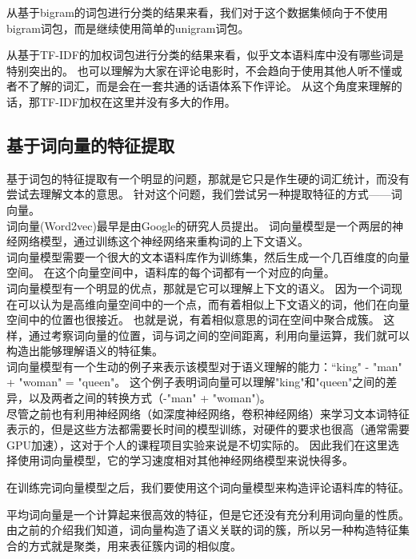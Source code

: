 

从基于bigram的词包进行分类的结果来看，我们对于这个数据集倾向于不使用bigram词包，而是继续使用简单的unigram词包。



从基于TF-IDF的加权词包进行分类的结果来看，似乎文本语料库中没有哪些词是特别突出的。
也可以理解为大家在评论电影时，不会趋向于使用其他人听不懂或者不了解的词汇，而是会在一套共通的话语体系下作评论。
从这个角度来理解的话，那TF-IDF加权在这里并没有多大的作用。

\subsection{基于词向量的特征提取}
基于词包的特征提取有一个明显的问题，那就是它只是作生硬的词汇统计，而没有尝试去理解文本的意思。
针对这个问题，我们尝试另一种提取特征的方式——词向量。\\
词向量(Word2vec)最早是由Google的研究人员提出。
词向量模型是一个两层的神经网络模型，通过训练这个神经网络来重构词的上下文语义。\\
词向量模型需要一个很大的文本语料库作为训练集，然后生成一个几百维度的向量空间。
在这个向量空间中，语料库的每个词都有一个对应的向量。\\
 词向量模型有一个明显的优点，那就是它可以理解上下文的语义。
 因为一个词现在可以认为是高维向量空间中的一个点，而有着相似上下文语义的词，他们在向量空间中的位置也很接近。
 也就是说，有着相似意思的词在空间中聚合成簇。
 这样，通过考察词向量的位置，词与词之间的空间距离，利用向量运算，我们就可以构造出能够理解语义的特征集。\\
 词向量模型有一个生动的例子来表示该模型对于语义理解的能力：“king" - "man" + "woman" = "queen"。
 这个例子表明词向量可以理解"king"和"queen"之间的差异，以及两者之间的转换方式（-"man" + "woman")。\\
 尽管之前也有利用神经网络（如深度神经网络，卷积神经网络）来学习文本词特征表示的，但是这些方法都需要长时间的模型训练，对硬件的要求也很高（通常需要GPU加速），这对于个人的课程项目实验来说是不切实际的。
 因此我们在这里选择使用词向量模型，它的学习速度相对其他神经网络模型来说快得多。
 
 
 
 
 
 在训练完词向量模型之后，我们要使用这个词向量模型来构造评论语料库的特征。
 
 
 
 平均词向量是一个计算起来很高效的特征，但是它还没有充分利用词向量的性质。
 由之前的介绍我们知道，词向量构造了语义关联的词的簇，所以另一种构造特征集合的方式就是聚类，用来表征簇内词的相似度。
 
 